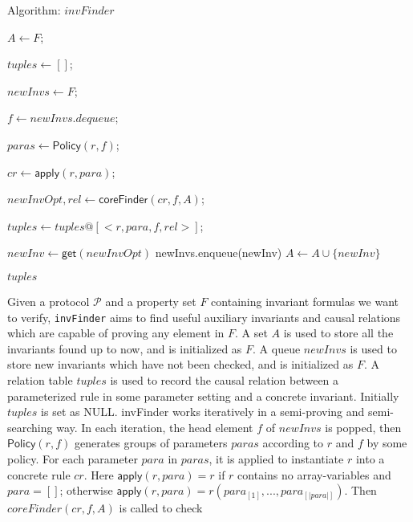 \documentclass{llncs}
\begin{document}
\begin{algorithm}\label{alg:invFinder}

\caption{Algorithm: $invFinder$}\label{alg:invfinder}



{
    $A\leftarrow F$;

    $tuples \leftarrow []$;

    $newInvs \leftarrow F$;

    {
   $ f \leftarrow newInvs.dequeue$;

   { $paras \leftarrow \mathsf{Policy}(r,f)$;

     {$cr \leftarrow \mathsf{apply}(r,para)$;

       $newInvOpt,rel \leftarrow \mathsf{coreFinder}(cr,  f, A)$;

        $tuples \leftarrow tuples @[<r, para, f, rel>]$;

        {$newInv \leftarrow \mathsf{get}(newInvOpt)$\;
         newInvs.enqueue(newInv)\;
        $A \leftarrow A \cup \{newInv\}$\;
        }

     }
   }
  }
\Return $tuples$\;
}


\end{algorithm}
\vspace{-0.8cm}
Given a protocol $\mathcal{P}$ and a property set $F$ containing invariant formulas we want to verify, {\tt invFinder} aims to find useful auxiliary invariants and causal relations which are capable of proving any element in $F$.  A set $A$ is used to store all the invariants found up to now, and is initialized as  $F$. A queue  $newInvs$ is used to store new invariants which have not been checked,  and  is initialized as  $F$.  A relation table $tuples$ is used to record the causal relation between a parameterized rule in some parameter setting and a concrete invariant. Initially $tuples$ is set as NULL.
{\sf invFinder}  works iteratively in a semi-proving and semi-searching way. In each iteration, the head element $f$ of $newInvs$ is popped,  then $\mathsf{Policy}(r,f)$  generates groups of parameters $paras$  according to $r$ and $f$ by some policy. For each parameter $para$ in $paras$,   it is applied to instantiate $r$ into a concrete rule $cr$.  Here  $\mathsf{apply}(r,para)=r$ if $r$ contains no array-variables and $para=[]$; otherwise $\mathsf{apply}(r,para)=r(para_{[1]},..., para_{[|para|]})$. Then $coreFinder(cr,  f, A)$ is called to check
\end{document}
